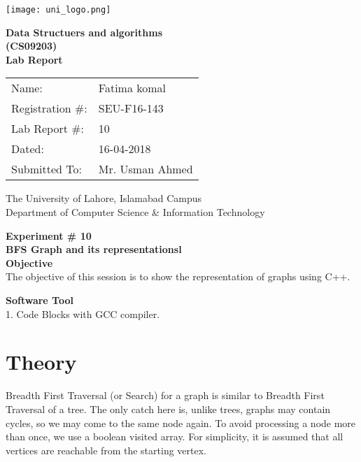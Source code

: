 \documentclass[11pt]{article}            %
\begin{document}
\begin{titlepage}
    \centering
  \vfill
    \texttt{[image: uni\_logo.png]} \\ 
	\vskip2cm
    {\bfseries\Large
	Data Structuers and algorithms \\ (CS09203)\\
	
	\vskip2cm
	Lab Report 
	 
	\vskip2cm
	}    

\begin{center}
\begin{tabular}{ l l  } 

Name: & Fatima komal \\ 
Registration \#: & SEU-F16-143 \\ 
Lab Report \#: & 10 \\ 
 Dated:& 16-04-2018\\ 
Submitted To:& Mr. Usman Ahmed\\ 

\end{tabular}
\end{center}
    \vfill
    The University of Lahore, Islamabad Campus\\
Department of Computer Science \& Information Technology
\end{titlepage}


    
    {\bfseries\Large
\centering
	Experiment \# 10 \\

BFS Graph and its representationsl \\
	
	}    
 \vskip1cm
 \textbf {Objective}\\ The objective of this session is to show the representation of graphs using C++. 
 
 \textbf {Software Tool} \\
 1. Code Blocks with GCC compiler.

\section{Theory }              

Breadth First Traversal (or Search) for a graph is similar to Breadth First Traversal of a tree. The only catch here is, unlike trees, graphs may contain cycles, so we may come to the same node again. To avoid processing a node more than once, we use a boolean visited array. For simplicity, it is assumed that all vertices are reachable from the starting vertex.
\end{document}
